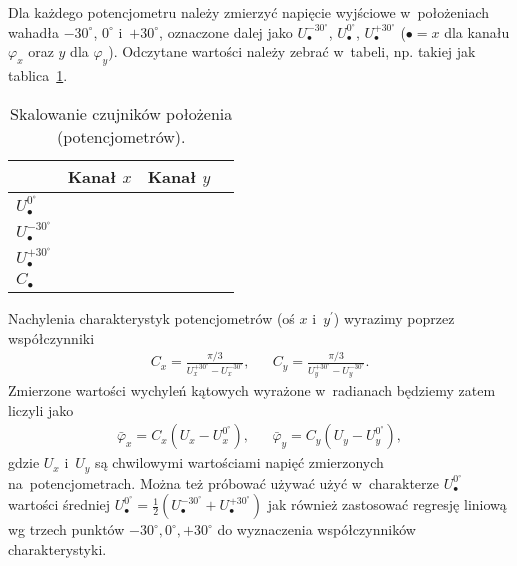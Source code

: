 \documentclass[paper=a4,DIV=12]{tmmlab}
\begin{document}
Dla każdego potencjometru należy zmierzyć
napięcie wyjściowe w~położeniach wahadła $-30^{\circ}$, $0^{\circ}$
i~$+30^{\circ}$, oznaczone dalej jako $U_{\bullet}^{-30^{\circ}}$,
$U_{\bullet}^{0^{\circ}}$, $U_{\bullet}^{+30^{\circ}}$ ($\bullet=x$ dla kanału
$\varphi_x$ oraz $y$ dla $\varphi_y$). Odczytane wartości należy zebrać
w~tabeli, np. takiej jak tablica~\ref{tab:KM4WU}.
\begin{table}[htbp]
  \caption{Skalowanie czujników położenia (potencjometrów).}
  \label{tab:KM4WU}
  \centering
  \begin{tabular}{|l|c|c|c|}
    \hline
                                  & Kanał $x$ & Kanał $y$ \\ \hline
      $U_{\bullet}^{0^{\circ}}$   &           &           \\ \hline
      $U_{\bullet}^{-30^{\circ}}$ &           &           \\ \hline
      $U_{\bullet}^{+30^{\circ}}$ &           &           \\ \hline
      $C_{\bullet}$               &           &           \\ \hline
  \end{tabular}
\end{table}

Nachylenia charakterystyk potencjometrów (oś $x$ i~$y^{\prime}$) wyrazimy poprzez
współczynniki
\begin{align}
  & C_x = \frac{\pi/3}{U_x^{+30^{\circ}} - U_x^{-30^{\circ}}}, &
  & C_y = \frac{\pi/3}{U_y^{+30^{\circ}} - U_y^{-30^{\circ}}}. &
  \label{eq:XIRR2}
\end{align}
Zmierzone wartości wychyleń kątowych wyrażone w~radianach będziemy zatem liczyli jako
\begin{align}
  &\bar{\varphi}_x = C_x \left(U_x - U_x^{0^{\circ}}\right),&
  &\bar{\varphi}_y = C_y \left(U_y - U_y^{0^{\circ}}\right),&
  \label{eq:547XS}
\end{align}
gdzie $U_x$ i~$U_y$ są chwilowymi wartościami napięć zmierzonych
na~potencjometrach. Można też próbować używać użyć w~charakterze
$U_{\bullet}^{0^{\circ}}$ wartości średniej $U_{\bullet}^{0^{\circ}} =
\tfrac{1}{2}\left(U_{\bullet}^{-30^{\circ}} + U_{\bullet}^{+30^{\circ}}\right)$
jak również zastosować regresję liniową wg trzech punktów $-30^{\circ},
0^{\circ}, +30^{\circ}$ do wyznaczenia współczynników charakterystyki.
\end{document}
